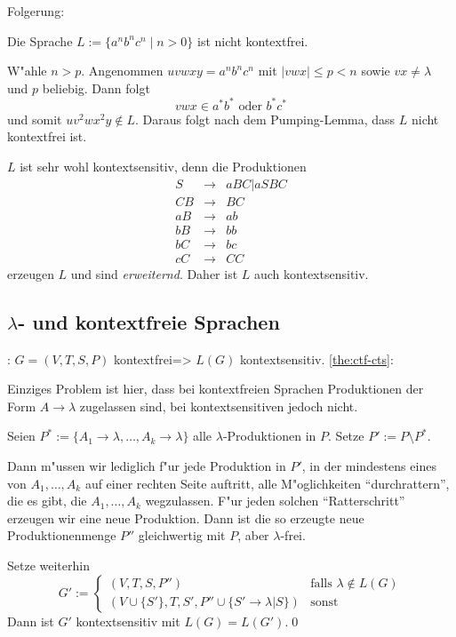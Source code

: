 \example Folgerung:{
  Die Sprache $L:=\{a^nb^nc^n \mid n > 0\}$ ist nicht kontextfrei.

  W"ahle $n>p$. Angenommen $uvwxy = a^nb^nc^n$ mit $|vwx| \leq p < n$
  sowie $vx \not= \lambda$ und $p$ beliebig. Dann folgt
  \[vwx \in a^*b^* \text{ oder } b^*c^*\]
  und somit $uv^2wx^2y \not\in L$. Daraus folgt nach dem Pumping-Lemma,
  dass $L$ nicht kontextfrei ist.
  
  $L$ ist sehr wohl kontextsensitiv, denn die
  Produktionen
  \begin{eqnarray*}
    S & \to & aBC | aSBC\\
    CB & \to & BC\\
    aB & \to & ab\\
    bB & \to & bb\\
    bC & \to & bc\\
    cC & \to & CC
  \end{eqnarray*}
  erzeugen $L$ und sind \emph{erweiternd}. Daher ist $L$ auch kontextsensitiv.
  }
\subsection{$\lambda$- und kontextfreie Sprachen}
\label{sub:ctf-lang}
\theorem:
  $G=(V,T,S,P)$ kontextfrei=>{
  \label{the:ctf-cts}
  $L(G)$ kontextsensitiv.
  }
\proof \ref{the:ctf-cts}:{
  Einziges Problem ist hier, dass bei kontextfreien Sprachen Produktionen
  der Form $A\to\lambda$ zugelassen sind, bei kontextsensitiven jedoch nicht.

  Seien $P^*:=\{A_1\to\lambda, \dots, A_k \to \lambda\}$ alle $\lambda$-Produktionen in
  $P$. Setze $P':=P\setminus P^*$.
  
  Dann m"ussen wir lediglich f"ur jede Produktion in $P'$, in der mindestens 
  eines von $A_1,\ldots,A_k$ auf einer rechten Seite auftritt, alle 
  M"oglichkeiten ``durchrattern'', die es gibt, die $A_1,\ldots,A_k$
  wegzulassen. F"ur jeden solchen ``Ratterschritt'' erzeugen wir eine 
  neue Produktion. Dann ist die so erzeugte neue Produktionenmenge $P''$
  gleichwertig mit $P$, aber $\lambda$-frei.

  Setze weiterhin 
  \[G':=\begin{cases}
       	(V, T, S, P'') & \text{falls } \lambda \not\in L(G)\\
       	(V \cup \{S'\}, T, S', P'' \cup \{S' \to \lambda | S\}) & \text{sonst}
      \end{cases}
    \]
  Dann ist $G'$ kontextsensitiv mit $L(G) = L(G')$.\qed
  }
